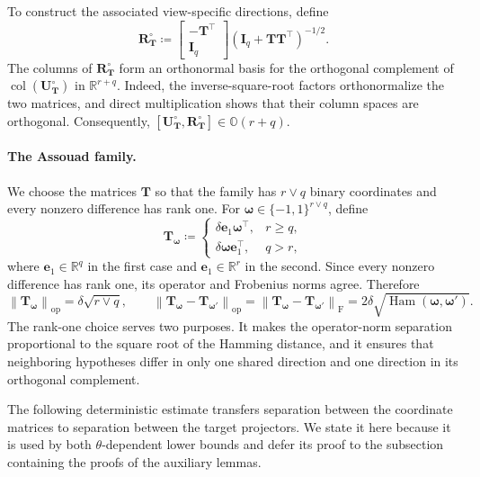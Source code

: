 \documentclass[11pt]{article}
\newcommand{\trans}{\top}
\newcommand{\opn}[1]{\left\lVert #1\right\rVert_{\mathrm{op}}}
\newcommand{\frn}[1]{\left\lVert #1\right\rVert_{\mathrm{F}}}
\begin{document}
To construct the associated view-specific directions, define
\begin{equation}
\label{eq:lower-graph-R}
  \bm R_{\bm T}^{\circ}
  \coloneqq
  \begin{bmatrix}
    -\bm T^\trans\\
    \bm I_q
  \end{bmatrix}
  (\bm I_q+\bm T\bm T^\trans)^{-1/2}.
\end{equation}
The columns of $\bm R_{\bm T}^{\circ}$ form an orthonormal basis for the
orthogonal complement of
$\operatorname{col}(\bm U_{\bm T}^{\circ})$ in $\mathbb R^{r+q}$.
Indeed, the inverse-square-root factors orthonormalize the two matrices,
and direct multiplication shows that their column spaces are orthogonal.
Consequently,
$[\bm U_{\bm T}^{\circ},\bm R_{\bm T}^{\circ}]
\in\mathbb O(r+q)$.


\paragraph{The Assouad family.}
We choose the matrices $\bm T$ so that the family has $r\vee q$ binary
coordinates and every nonzero difference has rank one.  For
$\bm\omega\in\{-1,1\}^{r\vee q}$, define
\[
  \bm T_{\bm\omega}
  \coloneqq
  \begin{cases}
    \delta\bm e_1\bm\omega^\trans,
      & r\ge q,\\[2mm]
    \delta\bm\omega\bm e_1^\trans,
      & q>r,
  \end{cases}
\]
where $\bm e_1\in\mathbb R^q$ in the first case and
$\bm e_1\in\mathbb R^r$ in the second.  Since every nonzero difference
has rank one, its operator and Frobenius norms agree.  Therefore
\begin{equation}
\label{eq:lower-cube-distance}
  \opn{\bm T_{\bm\omega}}
  =
  \delta\sqrt{r\vee q},
  \qquad
  \opn{
    \bm T_{\bm\omega}-\bm T_{\bm\omega'}
  }
  =
  \frn{
    \bm T_{\bm\omega}-\bm T_{\bm\omega'}
  }
  =
  2\delta
  \sqrt{\operatorname{Ham}(\bm\omega,\bm\omega')}.
\end{equation}
The rank-one choice serves two purposes.  It makes the operator-norm
separation proportional to the square root of the Hamming distance, and it
ensures that neighboring hypotheses differ in only one shared direction and
one direction in its orthogonal complement.

The following deterministic estimate transfers separation between the
coordinate matrices to separation between the target projectors.  We state it
here because it is used by both $\theta$-dependent lower bounds and defer its
proof to the subsection containing the proofs of the auxiliary lemmas.
\end{document}
